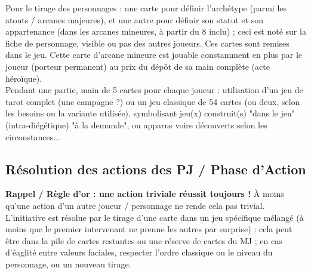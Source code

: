 \documentclass[11pt,twoside,a5paper]{book}
\begin{document}

Pour le tirage des personnages : une carte pour d{\'e}finir l'arch{\'e}type (parmi les atouts / arcanes majeures), et une autre pour d{\'e}finir son statut et son appartenance (dans les arcanes mineures, {\`a} partir du 8 inclu) ; ceci est not{\'e} sur la fiche de personnage, visible ou pas des autres joueurs. Ces cartes sont remises dans le jeu. Cette carte d'arcane mineure est jouable constamment en plus par le joueur (porteur permanent) au prix du d{\'e}p{\^o}t de sa main compl{\`e}te (acte h{\'e}ro{\"i}que).~\\  

Pendant une partie, main de 5 cartes pour chaque joueur : utilisation d'un jeu de tarot complet (une campagne ?) ou un jeu classique de 54 cartes (ou deux, selon les besoins ou la variante utilis{\'e}e), symbolisant jeu(x) construit(s) "dans le jeu" (intra-di{\'e}g{\'e}tique) "{\`a} la demande", ou apparus voire d{\'e}couverts selon les circonstances... %

\subsection{R{\'e}solution des actions des PJ / Phase d'Action}

\textbf{Rappel / R{\`e}gle d'or : une action triviale r{\'e}ussit toujours !} {\`A} moins qu'une action d'un autre joueur / personnage ne rende cela pas trivial. L'initiative est r{\'e}solue par le tirage d'une carte dans un jeu sp{\'e}cifique m{\'e}lang{\'e} ({\`a} moins que le premier intervenant ne prenne les autres par surprise) : cela peut {\^e}tre dans la pile de cartes restantes ou une r{\'e}serve de cartes du MJ ; en cas d'{\'e}aglit{\'e} entre valeurs faciales, respecter l'ordre classique ou le niveau du personnage, ou un nouveau tirage.~\\
\end{document}
